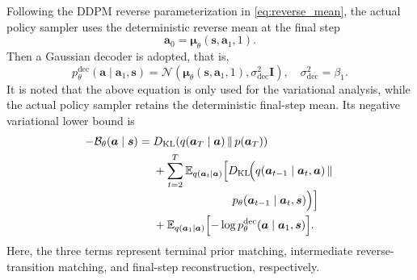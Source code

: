\documentclass[9pt,journal]{IEEEtran}
\newcommand{\E}{\mathbb{E}}
\newcommand{\va}{\bm{a}}
\newcommand{\vs}{\bm{s}}
\begin{document}
Following the DDPM reverse parameterization in
\eqref{eq:reverse_mean}, the actual policy sampler uses
the deterministic reverse mean at the final step
\begin{equation}
    \va_0
    =
    \bm\mu_\theta\!\left(\vs,\va_1,1\right).
    \label{eq:reverse_final}
\end{equation}
Then a Gaussian decoder is adopted, that is,
\begin{equation}
    p_\theta^{\mathrm{dec}}
    \!\left(\va\mid\va_1,\vs\right)
    =
    \mathcal N\!\left(
    \bm\mu_\theta\!\left(\vs,\va_1,1\right),
    \sigma_{\mathrm{dec}}^2\bm I
    \right),
    \quad
    \sigma_{\mathrm{dec}}^2=\beta_1.
    \label{eq:decoder}
\end{equation}
It is noted that the above equation is only used for the variational analysis, while the actual policy sampler retains the deterministic
final-step mean. Its negative variational lower bound is
\begin{equation}
\begin{aligned}
-\mathcal B_\theta(\va\mid\vs)
={}&
D_{\mathrm{KL}}\!\left(
q(\va_T\mid\va)\,\|\,p(\va_T)
\right)
\\
&+
\sum_{t=2}^{T}
\E_{q(\va_t\mid\va)}
\Bigl[
D_{\mathrm{KL}}\!\Bigl(
q(\va_{t-1}\mid\va_t,\va)\,\|\, 
\\[-0.2em]
&\hspace{7em}
p_\theta(\va_{t-1}\mid\va_t,\vs)
\Bigr)
\Bigr]
\\
&+
\E_{q(\va_1\mid\va)}
\Bigl[
-\log p_\theta^{\mathrm{dec}}\!\left(
\va\mid\va_1,\vs
\right)
\Bigr].
\end{aligned}
\label{eq:vlb_decomposition_start}
\end{equation}
Here, the three terms represent terminal prior matching, intermediate reverse-transition matching, and final-step reconstruction, respectively.
\end{document}

